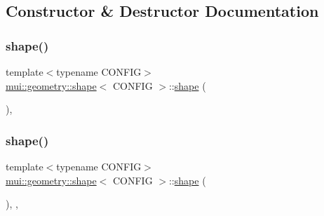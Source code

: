 \subsection{Constructor \& Destructor Documentation}
\mbox{\label{classmui_1_1geometry_1_1shape_ae4242c4894c84a49d8ada49c7bbe0b4b}} 
\subsubsection{\texorpdfstring{shape()}{shape()}\hspace{0.1cm}{\footnotesize\ttfamily [1/3]}}
{\footnotesize\ttfamily template$<$typename C\+O\+N\+F\+IG$>$ \\
\hyperlink{classmui_1_1geometry_1_1shape}{mui\+::geometry\+::shape}$<$ C\+O\+N\+F\+IG $>$\+::\hyperlink{classmui_1_1geometry_1_1shape}{shape} (\begin{DoxyParamCaption}{ }\end{DoxyParamCaption})\hspace{0.3cm}{\ttfamily [protected]}, {\ttfamily [default]}}

\mbox{\label{classmui_1_1geometry_1_1shape_adba3ac3cd94ee57a50f8ac6a23e22da6}} 
\subsubsection{\texorpdfstring{shape()}{shape()}\hspace{0.1cm}{\footnotesize\ttfamily [2/3]}}
{\footnotesize\ttfamily template$<$typename C\+O\+N\+F\+IG$>$ \\
\hyperlink{classmui_1_1geometry_1_1shape}{mui\+::geometry\+::shape}$<$ C\+O\+N\+F\+IG $>$\+::\hyperlink{classmui_1_1geometry_1_1shape}{shape} (\begin{DoxyParamCaption}\item[{\hyperlink{classmui_1_1geometry_1_1shape}{shape}$<$ C\+O\+N\+F\+IG $>$ \&\&}]{ }\end{DoxyParamCaption})\hspace{0.3cm}{\ttfamily [protected]}, {\ttfamily [default]}, {\ttfamily [noexcept]}}

